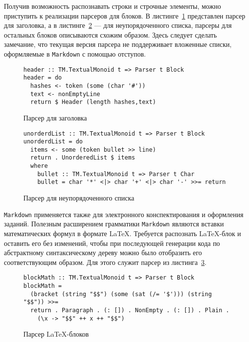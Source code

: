 Получив возможность распознавать строки и строчные элементы, можно приступить к реализации парсеров для блоков. В листинге~\ref{listing:MarkdownHeader} представлен парсер для заголовка, а в листинге~\ref{listing:markdownUlist} --- для неупорядоченного списка, парсеры для остальных блоков описываются схожим образом. Здесь следует сделать замечание, что текущая версия парсера не поддерживает вложенные списки, оформляемые в \lstinline{Markdown} с помощью отступов.

\begin{figure}[t]
\begin{lstlisting}
header :: TM.TextualMonoid t => Parser t Block
header = do
  hashes <- token (some (char '#'))
  text <- nonEmptyLine
  return $ Header (length hashes,text)
\end{lstlisting}
\caption{Парсер для заголовка}
\label{listing:MarkdownHeader}
\end{figure}

\begin{figure}[t]
\begin{lstlisting}
unorderdList :: TM.TextualMonoid t => Parser t Block
unorderdList = do
  items <- some (token bullet >> line)
  return . UnorderedList $ items
  where
    bullet :: TM.TextualMonoid t => Parser t Char
    bullet = char '*' <|> char '+' <|> char '-' >>= return
\end{lstlisting}
\caption{Парсер для неупорядоченного списка}
\label{listing:markdownUlist}
\end{figure}

\lstinline{Markdown} применяется также для электронного конспектирования и
оформления заданий. Полезным расширением грамматики \lstinline{Markdown}
являются вставки математических формул в формате \LaTeX. Требуется распознать
\LaTeX-блок и оставить его без изменений, чтобы при последующей генерации кода
по абстрактному синтаксическому дереву можно было отобразить его соответствующим
образом. Для этого служит парсер из листинга~\ref{listing:MarkdownLaTeX}.

\begin{figure}[h]
\begin{lstlisting}
blockMath :: TM.TextualMonoid t => Parser t Block
blockMath = 
  (bracket (string "$$") (some (sat (/= '$'))) (string "$$")) >>= 
  return . Paragraph . (: []) . NonEmpty . (: []) . Plain .
    (\x -> "$$" ++ x ++ "$$")
\end{lstlisting}
\caption{Парсер \LaTeX-блоков}
\label{listing:MarkdownLaTeX}
\end{figure}

